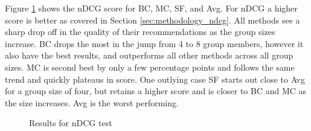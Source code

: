 Figure \ref{fig:ndcg} shows the nDCG score for BC, MC, SF, and Avg. For nDCG a higher score is better as covered in Section \ref{sec:methodology_ndcg}.
All methods see a sharp drop off in the quality of their recommendations as the group sizes increase.
BC drops the most in the jump from 4 to 8 group members, however it also have the best results, and outperforms all other methods across all group sizes.
MC is second best by only a few percentage points and follows the same trend and quickly plateaus in score.
One outlying case SF starts out close to Avg for a group size of four, but retains a higher score and is closer to BC and MC as the size increases.
Avg is the worst performing.

\begin{figure}[H]
	\caption{Results for nDCG test}\label{fig:ndcg}
\end{figure}